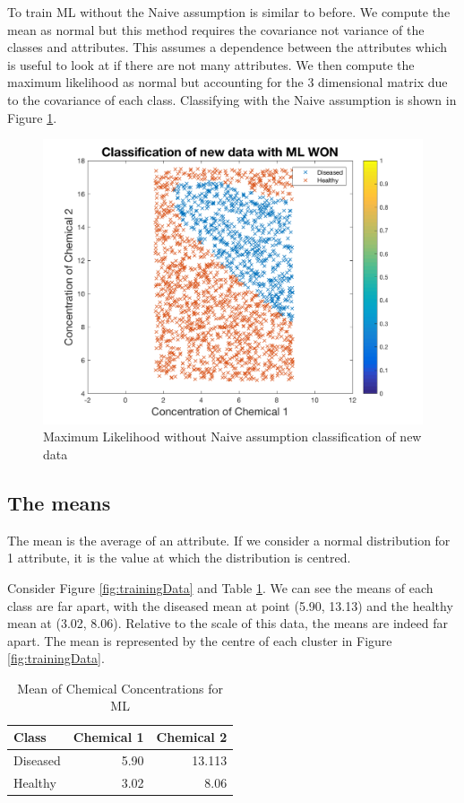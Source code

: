 {To train ML without the Naive assumption is similar to before. We compute the mean as normal but this method requires the covariance not variance of the classes and attributes. This assumes a dependence between the attributes which is useful to look at if there are not many attributes. We then compute the maximum likelihood as normal but accounting for the 3 dimensional matrix due to the covariance of each class. Classifying with the Naive assumption is shown in Figure \ref{fig:MLWON}.

\begin{figure}[h]
	\centering
	\includegraphics[width=0.8\linewidth]{images/MLWONnewData}
	\caption{Maximum Likelihood without Naive assumption classification of new data}
	\label{fig:MLWON}
\end{figure}

\subsection{The means}
The mean is the average of an attribute. If we consider a normal distribution for 1 attribute, it is the value at which the distribution is centred.

Consider Figure \ref{fig:trainingData} and Table \ref{t:mean}. We can see the means of each class are far apart, with the diseased mean at point (5.90, 13.13) and the healthy mean at (3.02, 8.06). Relative to the scale of this data, the means are indeed far apart. The mean is represented by the centre of each cluster in Figure \ref{fig:trainingData}.

\begin{table}[h]
	\centering
	\caption{Mean of Chemical Concentrations for ML}
	\label{t:mean}
	\begin{tabular}{lrr}
		\hline
		\textbf{Class} & \textbf{Chemical 1} & \textbf{Chemical 2} \\ \hline
		Diseased & 5.90 & 13.113 \\
		Healthy & 3.02 & 8.06  \\
	\end{tabular}
\end{table}

}

